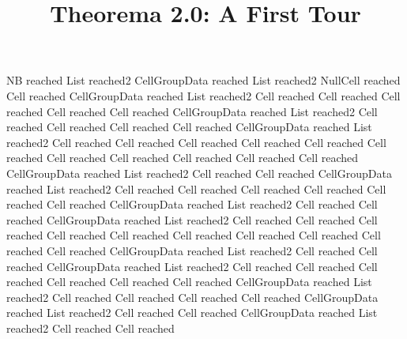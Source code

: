 \documentclass{article}
\begin{document}
% 

\title{Theorema 2.0: A First Tour}
\author{}
\date{}
\maketitle

NB reached List reached2 CellGroupData reached List reached2 NullCell reached Cell reached CellGroupData reached List reached2 Cell reached Cell reached Cell reached Cell reached Cell reached CellGroupData reached List reached2 Cell reached Cell reached Cell reached Cell reached CellGroupData reached List reached2 Cell reached Cell reached Cell reached Cell reached Cell reached Cell reached Cell reached Cell reached Cell reached Cell reached Cell reached CellGroupData reached List reached2 Cell reached Cell reached CellGroupData reached List reached2 Cell reached Cell reached Cell reached Cell reached Cell reached Cell reached CellGroupData reached List reached2 Cell reached Cell reached CellGroupData reached List reached2 Cell reached Cell reached Cell reached Cell reached Cell reached Cell reached Cell reached Cell reached Cell reached Cell reached CellGroupData reached List reached2 Cell reached Cell reached CellGroupData reached List reached2 Cell reached Cell reached Cell reached Cell reached Cell reached Cell reached CellGroupData reached List reached2 Cell reached Cell reached Cell reached Cell reached CellGroupData reached List reached2 Cell reached Cell reached CellGroupData reached List reached2 Cell reached Cell reached 
\end{document}
